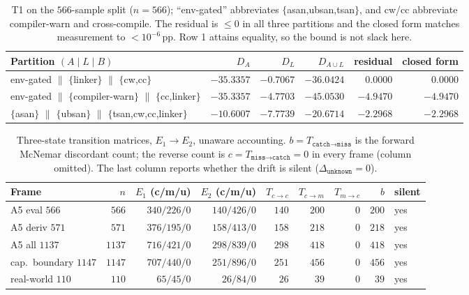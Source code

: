 \documentclass{article}
\newcommand{\catch}{\texttt{catch}}
\newcommand{\miss}{\texttt{miss}}
\newcommand{\unk}{\texttt{unknown}}
\newcommand{\pp}{\,\mathrm{pp}}
\begin{document}
\begin{table}[h]
\centering
\small
\caption{T1 on the $566$-sample split ($n=566$); ``env-gated'' abbreviates $\{$asan,ubsan,tsan$\}$, and
cw/cc abbreviate compiler-warn and cross-compile. The residual is $\le0$ in all three partitions and the
closed form matches measurement to $<10^{-6}\pp$. Row 1 attains equality, so the bound is not slack here.}
\label{tab:t1}
\begin{tabular}{@{}p{4.9cm} r r r r r@{}}
\toprule
Partition $(A\mid L\mid B)$ & $D_A$ & $D_L$ & $D_{A\cup L}$ & residual & closed form \\
\midrule
env-gated $\|$ $\{$linker$\}$ $\|$ $\{$cw,cc$\}$ & $-35.3357$ & $-0.7067$ & $-36.0424$ & $0.0000$ & $0.0000$ \\
env-gated $\|$ $\{$compiler-warn$\}$ $\|$ $\{$cc,linker$\}$ & $-35.3357$ & $-4.7703$ & $-45.0530$ & $-4.9470$ & $-4.9470$ \\
$\{$asan$\}$ $\|$ $\{$ubsan$\}$ $\|$ $\{$tsan,cw,cc,linker$\}$ & $-10.6007$ & $-7.7739$ & $-20.6714$ & $-2.2968$ & $-2.2968$ \\
\bottomrule
\end{tabular}
\end{table}

\begin{table}[h]
\centering
\small
\caption{Three-state transition matrices, $E_1\to E_2$, unaware accounting. $b=T_{\catch\to\miss}$ is the
forward McNemar discordant count; the reverse count is $c=T_{\miss\to\catch}=0$ in every frame (column
omitted). The last column reports whether the drift is silent ($\Delta_{\unk}=0$).}
\label{tab:transition}
\begin{tabular}{@{}p{3.5cm} r r r r r r r l@{}}
\toprule
Frame & $n$ & $E_1$ (c/m/u) & $E_2$ (c/m/u) & $T_{c\to c}$ & $T_{c\to m}$ & $T_{m\to c}$ & $b$ & silent \\
\midrule
A5 eval $566$ & $566$ & $340/226/0$ & $140/426/0$ & $140$ & $200$ & $0$ & $200$ & yes \\
A5 deriv $571$ & $571$ & $376/195/0$ & $158/413/0$ & $158$ & $218$ & $0$ & $218$ & yes \\
A5 all $1137$ & $1137$ & $716/421/0$ & $298/839/0$ & $298$ & $418$ & $0$ & $418$ & yes \\
cap.\ boundary $1147$ & $1147$ & $707/440/0$ & $251/896/0$ & $251$ & $456$ & $0$ & $456$ & yes \\
real-world $110$ & $110$ & $65/45/0$ & $26/84/0$ & $26$ & $39$ & $0$ & $39$ & yes \\
\bottomrule
\end{tabular}
\end{table}
\end{document}
